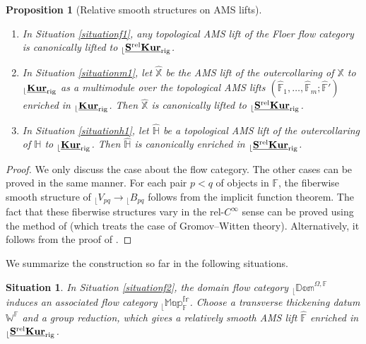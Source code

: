 \documentclass[reqno, 10pt]{amsart}
\numberwithin{equation}{section}
\numberwithin{equation}{section}
\newtheorem{situationf}{Situation}
\newtheorem{prop}[thm]{Proposition}
\theoremstyle{definition}
\theoremstyle{remark}
\newcommand{\mb}{\mathbb}
\renewcommand{\outer}{{}_{\lfloor}}
\newcommand{\uds}[1]{\underline{\smash{#1}}}
\begin{document}
\begin{prop}[Relative smooth structures on AMS lifts]\hfill
\begin{enumerate}

\item In Situation \ref{situationf1}, any topological AMS lift of the Floer flow category is canonically lifted to $\outer \uds {\bf S^{\rm rel} Kur}_{\rm rig}$.

\item In Situation \ref{situationm1}, let $\hat{\mb X}$ be the AMS lift of the outercollaring of ${\mb X}$ to $\outer \uds{\bf Kur}_{\rm rig}$ as a multimodule over the topological AMS lifts $(\hat{\mb F}_1, \ldots, \hat{\mb F}_m; \hat{\mb F}')$ enriched in $\outer \uds{\bf Kur}_{\rm rig}$. Then $\hat {\mb X}$ is canonically lifted to $\outer \uds{\bf S^{\rm rel} Kur}_{\rm rig}$.

\item In Situation \ref{situationh1}, let $\hat {\mb H}$ be a topological AMS lift of the outercollaring of ${\mb H}$ to $\outer \uds{\bf Kur}_{\rm rig}$. Then $\hat {\mb H}$ is canonically enriched in $\outer \uds{\bf S^{\rm rel} Kur}_{\rm rig}$.

\end{enumerate}
\end{prop}

\begin{proof}
We only discuss the case about the flow category. The other cases can be proved in the same manner. For each pair $p<q$ of objects in ${\mb F}$, the fiberwise smooth structure of $\outer V_{pq} \to \outer B_{pq}$ follows from the implicit function theorem. The fact that these fiberwise structures vary in the rel-$C^\infty$ sense can be proved using the method of \cite{Swaminathan_relative} (which treats the case of Gromov--Witten theory). Alternatively, it follows from the proof of \cite[Proposition 6.2]{Bai_Xu_Arnold}.
\end{proof}

We summarize the construction so far in the following situations.

\begin{situationf}\label{situationf3}
In Situation \ref{situationf2}, the domain flow category $\outer \mb{Dom}^{\Omega, {\mb F}}$ induces an associated flow category $\outer \mb{Map}_{\mb F}^{\mb{fr}}$. Choose a transverse thickening datum ${\mb W}^{\mb F}$ and a group reduction, which gives a relatively smooth AMS lift $\hat{\mb F}$ enriched in $\outer \uds{\bf S^{\rm rel} Kur}_{\rm rig}$.
\end{situationf}
\end{document}
